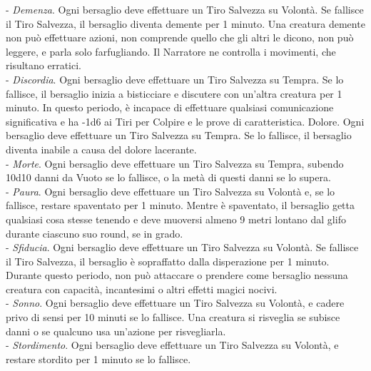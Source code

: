 \begin{multicols}{2}
- \textit{Demenza}. Ogni bersaglio deve effettuare un Tiro Salvezza su Volontà. Se fallisce il Tiro Salvezza, il bersaglio diventa demente per 1 minuto. Una creatura demente non può effettuare azioni, non comprende quello che gli altri le dicono, non può leggere, e parla solo farfugliando. Il Narratore ne controlla i movimenti, che risultano erratici.\\
- \textit{Discordia}. Ogni bersaglio deve effettuare un Tiro Salvezza su Tempra. Se lo fallisce, il bersaglio inizia a bisticciare e discutere con un'altra creatura per 1 minuto. In questo periodo, è incapace di effettuare qualsiasi comunicazione significativa e ha -1d6 ai Tiri per Colpire e le prove di caratteristica. Dolore. Ogni bersaglio deve effettuare un Tiro Salvezza su Tempra. Se lo fallisce, il bersaglio diventa inabile a causa del dolore lacerante.\\
- \textit{Morte}. Ogni bersaglio deve effettuare un Tiro Salvezza su Tempra, subendo 10d10 danni da Vuoto se lo fallisce, o la metà di questi danni se lo supera.\\
- \textit{Paura}. Ogni bersaglio deve effettuare un Tiro Salvezza su Volontà e, se lo fallisce, restare spaventato per 1 minuto. Mentre è spaventato, il bersaglio getta qualsiasi cosa stesse tenendo e deve muoversi almeno 9 metri lontano dal glifo durante ciascuno suo round, se in grado.\\
- \textit{Sfiducia}. Ogni bersaglio deve effettuare un Tiro Salvezza su Volontà. Se fallisce il Tiro Salvezza, il bersaglio è sopraffatto dalla disperazione per 1 minuto. Durante questo periodo, non può attaccare o prendere come bersaglio nessuna creatura con capacità, incantesimi o altri effetti magici nocivi.\\
- \textit{Sonno}. Ogni bersaglio deve effettuare un Tiro Salvezza su Volontà, e cadere privo di sensi per 10 minuti se lo fallisce. Una creatura si risveglia se subisce danni o se qualcuno usa un'azione per risvegliarla.\\
- \textit{Stordimento}. Ogni bersaglio deve effettuare un Tiro Salvezza su Volontà, e restare stordito per 1 minuto se lo fallisce.


\end{multicols}
